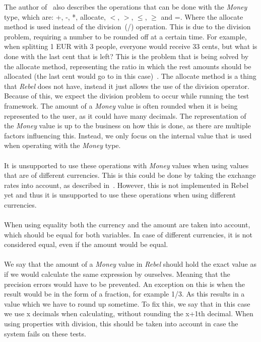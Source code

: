 The author of~\cite{fowler2002patterns} also describes the operations that can
be done with the \textit{Money} type, which are: +, -, *, allocate, $<$, $>$,
$\leq$, $\geq$ and =. Where the allocate method is used instead of the
division~(/) operation. This is due to the division problem, requiring a number
to be rounded off at a certain time. For example, when splitting 1 EUR with 3
people, everyone would receive 33 cents, but what is done with the last cent
that is left? This is the problem that is being solved by the allocate method,
representing the ratio in which the rest amounts should be allocated (the last
cent would go to in this case)~\cite{fowler2002patterns}. The allocate method is
a thing that \textit{Rebel} does not have, instead it just allows the use of the
division operator. Because of this, we expect the division problem to occur
while running the test framework. The amount of a \textit{Money} value is often
rounded when it is being represented to the user, as it could have many
decimals. The representation of the \textit{Money} value is up to the business
on how this is done, as there are multiple factors influencing this. Instead, we
only focus on the internal value that is used when operating with the
\textit{Money} type.\\
\\
It is unsupported to use these operations with \textit{Money} values when using
values that are of different currencies. This is this could be done by taking
the exchange rates into account, as described in~\cite{fowler2002patterns}.
However, this is not implemented in Rebel yet and thus it is unsupported to use
these operations when using different currencies.\\
\\
When using equality both the currency and the amount are taken into account,
which should be equal for both variables. In case of different currencies, it is
not considered equal, even if the amount would be equal. \\
\\
We say that the amount of a \textit{Money} value in \textit{Rebel} should hold the exact value as if we would calculate the same expression by ourselves. Meaning that the precision errors would have to be prevented. An exception on this is when the result would be in the form of a fraction, for example 1/3. As this results in a value which we have to round up sometime. To fix this, we say that in this case we use x decimals when calculating, without rounding the x+1th decimal. When using properties with division, this should be taken into account in case the system fails on these tests. 

